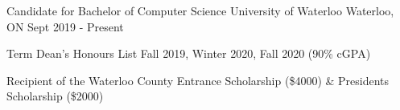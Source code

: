 
\begin{cventries}
  \cventry
    {Candidate for Bachelor of Computer Science} %
    {University of Waterloo} %
    {Waterloo, ON} %
    {Sept 2019 - Present} %
    {
      \begin{cvitems} %
         \item {Term Dean's Honours List Fall 2019, Winter 2020, Fall 2020 (90\% cGPA)}
         \vspace{0.5mm}
         \item {Recipient of the Waterloo County Entrance Scholarship (\$4000) \& President\textquotesingle s Scholarship (\$2000)}
      \end{cvitems}
    }
\end{cventries}
